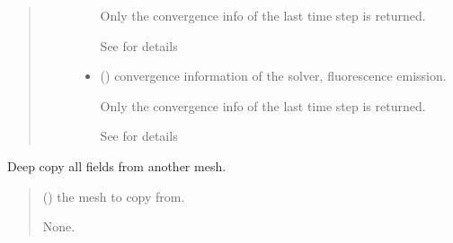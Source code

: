 \documentclass[letterpaper,10pt,english]{sphinxmanual}
\begin{document}
\begin{fulllineitems}
\begin{fulllineitems}
\begin{quote}
\begin{description}
\begin{itemize}
\sphinxAtStartPar
Only the convergence info of the last time step is returned.

\sphinxAtStartPar
See {\hyperref[\detokenize{_autosummary/nirfasterff.utils.ConvergenceInfo:nirfasterff.utils.ConvergenceInfo}]{}} for details

\item {} 
\sphinxAtStartPar
{} () \textendash{} convergence information of the solver, fluorescence emission.

\sphinxAtStartPar
Only the convergence info of the last time step is returned.

\sphinxAtStartPar
See {\hyperref[\detokenize{_autosummary/nirfasterff.utils.ConvergenceInfo:nirfasterff.utils.ConvergenceInfo}]{}} for details

\end{itemize}


\end{description}\end{quote}

\end{fulllineitems}


\begin{fulllineitems}
\label{\detokenize{_autosummary/nirfasterff.base.fluor_mesh.fluormesh:nirfasterff.base.fluor_mesh.fluormesh.from_copy}}
\pysigstartsignatures
{}
\pysigstopsignatures
\sphinxAtStartPar
Deep copy all fields from another mesh.
\begin{quote}\begin{description}
\sphinxAtStartPar
{} () \textendash{} the mesh to copy from.

\sphinxAtStartPar
None.

\end{description}\end{quote}

\end{fulllineitems}


\end{fulllineitems}
\end{document}

